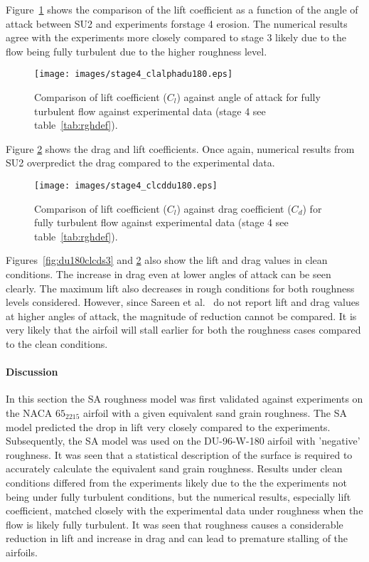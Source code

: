 Figure~\ref{fig:du180clals4} shows the comparison of the lift coefficient as a function of the angle of attack between SU2 and experiments forstage 4 erosion. The numerical results agree with the experiments more closely compared to stage 3 likely due to the flow being fully turbulent due to the higher roughness level.
\begin{figure}[h!]
    \centering
    \captionsetup{justification=centering}
    \texttt{[image: images/stage4\_clalphadu180.eps]}
    \caption{Comparison of lift coefficient ($C_l$) against angle of attack for fully turbulent flow against experimental data (stage 4 see table~\ref{tab:rghdef}).}
    \label{fig:du180clals4}
\end{figure}
Figure \ref{fig:du180clcds4} shows the drag and lift coefficients. Once again, numerical results from SU2 overpredict the drag compared to the experimental data. 
\begin{figure}[h!]
    \centering
    \captionsetup{justification=centering}
    \texttt{[image: images/stage4\_clcddu180.eps]}
    \caption{Comparison of lift coefficient ($C_l$) against drag coefficient ($C_d$) for fully turbulent flow against experimental data (stage 4 see table~\ref{tab:rghdef}).}
    \label{fig:du180clcds4}
\end{figure}

Figures~\ref{fig:du180clcds3} and \ref{fig:du180clcds4} also show the lift and drag values in clean conditions. The increase in drag even at lower angles of attack can be seen clearly. The maximum lift also decreases in rough conditions for both roughness levels considered. However, since Sareen et al.~\cite{sareen2014effects} do not report lift and drag values at higher angles of attack, the magnitude of reduction cannot be compared. It is very likely that the airfoil will stall earlier for both the roughness cases compared to the clean conditions.

\paragraph*{Discussion}
In this section the SA roughness model was first validated against experiments on the NACA $65_2215$ airfoil with a given equivalent sand grain roughness. The SA model predicted the drop in lift very closely compared to the experiments. Subsequently, the SA model was used on the DU-96-W-180 airfoil with 'negative' roughness. It was seen that a statistical description of the surface is required to accurately calculate the equivalent sand grain roughness. Results under clean conditions differed from the experiments likely due to the the experiments not being under fully turbulent conditions, but the numerical results, especially lift coefficient, matched closely with the experimental data under roughness when the flow is likely fully turbulent. It was seen that roughness causes a considerable reduction in lift and increase in drag and can lead to premature stalling of the airfoils.


